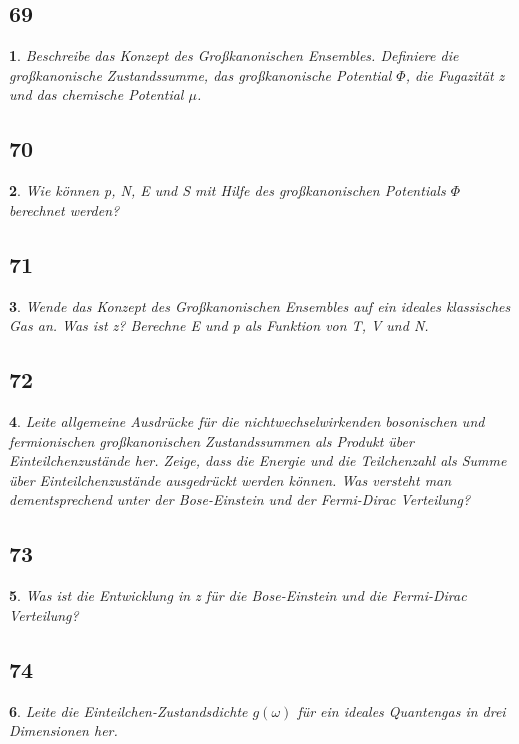 \documentclass[12pt,a4paper]{report}
\newtheorem{myfrag}{}%
\begin{document}
\subsection{69}
\begin{myfrag}
Beschreibe das Konzept des Großkanonischen Ensembles. Definiere die
großkanonische Zustandssumme, das großkanonische Potential $\Phi$, die
Fugazität z und das chemische Potential $\mu$.
\end{myfrag}
\subsection{70}
\begin{myfrag}
Wie können p, N, E und S mit Hilfe des großkanonischen Potentials $\Phi$
berechnet werden?
\end{myfrag}
\subsection{71}
\begin{myfrag}
Wende das Konzept des Großkanonischen Ensembles auf ein ideales
klassisches Gas an. Was ist z? Berechne E und p als Funktion von T, V und
N.
\end{myfrag}
\subsection{72}
\begin{myfrag}
Leite allgemeine Ausdrücke für die nichtwechselwirkenden bosonischen und
fermionischen großkanonischen Zustandssummen als Produkt über Einteilchenzustände
her. Zeige, dass die Energie und die Teilchenzahl als
Summe über Einteilchenzustände ausgedrückt werden können. Was versteht
man dementsprechend unter der Bose-Einstein und der Fermi-Dirac
Verteilung?
\end{myfrag}
\subsection{73}
\begin{myfrag}
Was ist die Entwicklung in z für die Bose-Einstein und die Fermi-Dirac
Verteilung?
\end{myfrag}
\subsection{74}
\begin{myfrag}
Leite die Einteilchen-Zustandsdichte $g(\omega )$ für ein ideales Quantengas in drei
Dimensionen her.
\end{myfrag}
\end{document}
